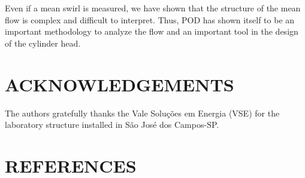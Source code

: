 \documentclass[12pt,a4paper]{article}
\begin{document}
Even if a mean swirl is measured, we have shown that the structure of the mean flow is complex and difficult to interpret. Thus, POD has shown itself to be an important methodology to analyze the flow and an important tool in the design of the cylinder head.


\section{ACKNOWLEDGEMENTS}

The authors gratefully thanks the Vale Solu\c{c}\~{o}es em Energia (VSE) for the laboratory structure installed in S\~{a}o Jos\'{e} dos Campos-SP.


\section{REFERENCES}
\end{document}
